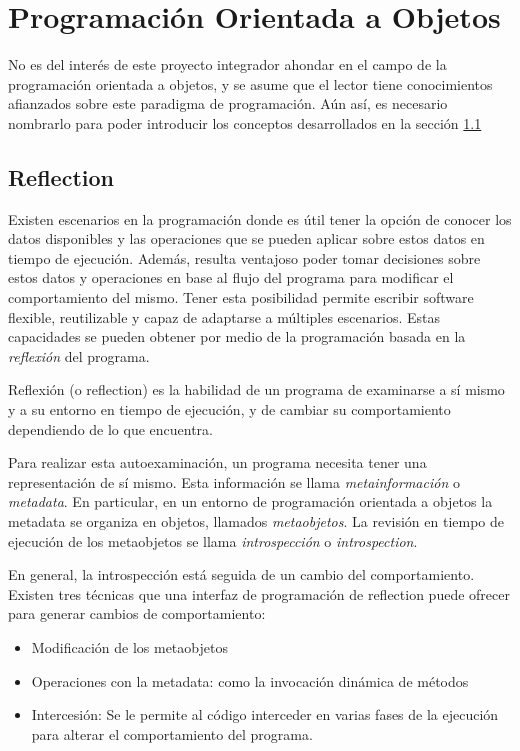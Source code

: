 \section{Programación Orientada a Objetos}

No es del interés de este proyecto integrador ahondar en el campo de la
programación orientada a objetos, y se asume que el lector tiene conocimientos
afianzados sobre este paradigma de programación. Aún así, es necesario nombrarlo
para poder introducir los conceptos desarrollados en la sección \ref{reflection}

\subsection{Reflection}
\label{reflection}

Existen escenarios en la programación donde es útil tener la opción de conocer
los datos disponibles y las operaciones que se pueden aplicar sobre estos datos
en tiempo de ejecución. Además, resulta ventajoso poder tomar decisiones sobre
estos datos y operaciones en base al flujo del programa para modificar el
comportamiento del mismo. Tener esta posibilidad permite escribir software
flexible, reutilizable y capaz de adaptarse a múltiples escenarios. Estas
capacidades se pueden obtener por medio de la programación basada en la
\textit{reflexión} del programa.

Reflexión (o reflection) es la habilidad de un programa de examinarse a sí
mismo y a su entorno en tiempo de ejecución, y de cambiar su comportamiento
dependiendo de lo que encuentra.

Para realizar esta autoexaminación, un programa necesita tener una
representación de sí mismo. Esta información se llama \textit{metainformación} o
\textit{metadata}. En particular, en un entorno de programación orientada a
objetos la metadata se organiza en objetos, llamados \textit{metaobjetos}. La
revisión en tiempo de ejecución de los metaobjetos se llama
\textit{introspección} o \textit{introspection}.
\cite{Forman04javareflection}

En general, la introspección está seguida de un cambio del comportamiento.
Existen tres técnicas que una interfaz de programación de reflection puede
ofrecer para generar cambios de comportamiento:
\begin{itemize}
    \item Modificación de los metaobjetos
    \item Operaciones con la metadata: como la invocación dinámica de métodos 
    \item Intercesión: Se le permite al código interceder en varias fases de la
    ejecución para alterar el comportamiento del programa.
\end{itemize}

